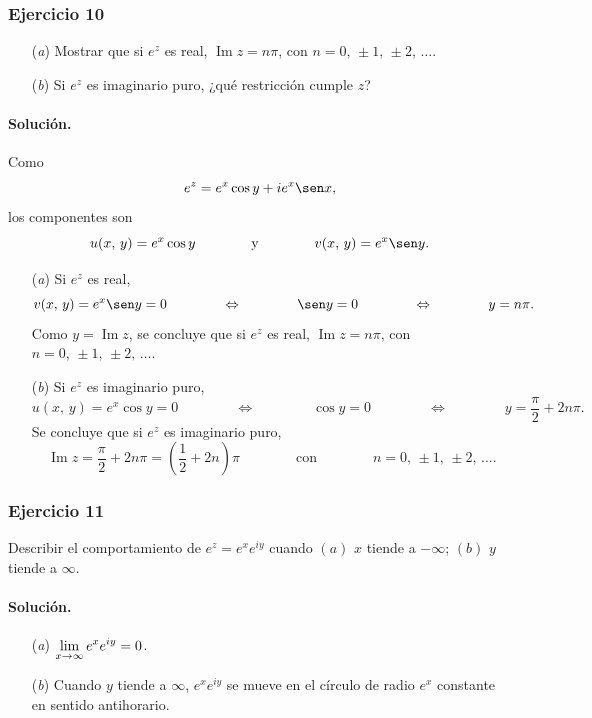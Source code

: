 \documentclass[a4paper]{report}
\renewcommand{\Im}{\operatorname{Im}}
\begin{document}
\subsubsection{Ejercicio 10}

\begin{enumerate}
 \item[(\textit{a})] Mostrar que si \(e^z\) es real, \(\Im z=n\pi\), con \(n=0,\,\pm1,\,\pm2,\,\dots\).
 \item[(\textit{b})] Si \(e^z\) es imaginario puro, ¿qué restricción cumple \(z\)?
\end{enumerate}

\paragraph{Solución.} Como
\[
 e^{z}=e^x\cos y+ie^x\sen x,
\]
los componentes son
\[
 u(x,\,y)=e^x\cos y
 \qquad\qquad\textrm{y}\qquad\qquad
 v(x,\,y)=e^x\sen y.
\]
\begin{enumerate}
 \item[(\textit{a})] Si \(e^z\) es real,
 \[
  v(x,\,y)=e^x\sen y=0
  \qquad\qquad\Leftrightarrow\qquad\qquad
  \sen y=0
  \qquad\qquad\Leftrightarrow\qquad\qquad
  y=n\pi.
 \]
 Como \(y=\Im z\), se concluye que si \(e^z\) es real, \(\Im z=n\pi\), con \(n=0,\,\pm1,\,\pm2,\,\dots\).
 \item[(\textit{b})] Si \(e^z\) es imaginario puro,
  \[
  u(x,\,y)=e^x\cos y=0
  \qquad\qquad\Leftrightarrow\qquad\qquad
  \cos y=0
  \qquad\qquad\Leftrightarrow\qquad\qquad
  y=\frac{\pi}{2}+2n\pi.
 \]
 Se concluye que si \(e^z\) es imaginario puro,
 \[
  \Im z=\frac{\pi}{2}+2n\pi=\left(\frac{1}{2}+2n\right)\pi
  \qquad\qquad\textrm{con}\qquad\qquad
  n=0,\,\pm1,\,\pm2,\,\dots.
 \]
\end{enumerate}

\subsubsection{Ejercicio 11}

Describir el comportamiento de \(e^z=e^xe^{iy}\) cuando \((a)\) \(x\) tiende a \(-\infty\); \((b)\) \(y\) tiende a \(\infty\).

\paragraph{Solución.}

\begin{enumerate}
 \item[(\textit{a})] \(\displaystyle\lim_{x\to\-\infty}e^xe^{iy}=0\).
 \item[(\textit{b})] Cuando \(y\) tiende a \(\infty\), \(e^xe^{iy}\) se mueve en el círculo de radio \(e^x\) constante en sentido antihorario.
\end{enumerate}
\end{document}
